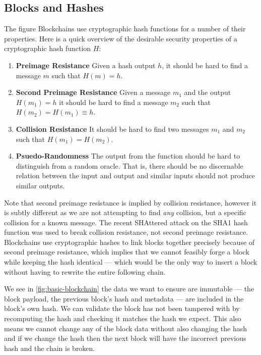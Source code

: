 \subsection{Blocks and Hashes}
\label{ch:blockchain:structure:basics}

The figure Blockchains use cryptographic hash functions for a number of their properties. Here is a quick overview of the desirable security properties of a cryptographic hash function $H$:


\begin{enumerate}
    \item \textbf{Preimage Resistance} Given a hash output $h$, it should be hard to find a message $m$ such that $H(m) = h$.
    \item \textbf{Second Preimage Resistance} Given a message $m_1$ and the output $H(m_1) = h$ it should be hard to find a message $m_2$ such that $H(m_2) = H(m_1) \equiv h$.
    \item \textbf{Collision Resistance} It should be hard to find two messages $m_1$ and $m_2$ such that $H(m_1) = H(m_2)$.
    \item \textbf{Psuedo-Randomness} The output from the function should be hard to distinguish from a random oracle. That is, there should be no discernable relation between the input and output and similar inputs should not produce similar outputs.
\end{enumerate}

Note that second preimage resistance is implied by collision resistance, however it is subtly different as we are not attempting to find \emph{any} collision, but a specific collision for a known message. The recent SHAttered \cite{katz_first_2017} attack on the SHA1 hash function was used to break collision resistance, not second preimage resistance. Blockchains use cryptographic hashes to link blocks together precisely because of second preimage resistance, which implies that we cannot feasibly forge a block while keeping the hash identical --- which would be the only way to insert a block without having to rewrite the entire following chain.

We see in \autoref{fig:basic-blockchain} the data we want to ensure are immutable --- the block payload, the previous block's hash and metadata --- are included in the block's own hash.  We can validate the block has not been tampered with by recomputing the hash and checking it matches the hash we expect. This also means we cannot change any of the block data without also changing the hash and if we change the hash then the next block will have the incorrect previous hash and the chain is broken.

